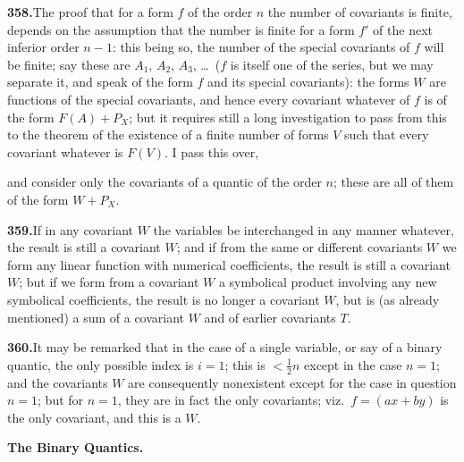 \documentclass[11pt,a4paper]{article}
\theoremstyle{definition}
\begin{document}
\smallskip
\noindent\textbf{358.}\quad The proof that for a form $f$ of the order $n$ the number of covariants is finite, depends on the assumption that the number is finite for a form $f'$ of the next inferior order $n-1$: this being so, the number of the special covariants of $f$ will be finite; say these are $A_1$, $A_2$, $A_3$, \ldots\ ($f$ is itself one of the series, but we may separate it, and speak of the form $f$ and its special covariants): the forms $W$ are functions of the special covariants, and hence every covariant whatever of $f$ is of the form $F(A) + P_X$; but it requires still a long investigation to pass from this to the theorem of the existence of a finite number of forms $V$ such that every covariant whatever is $F(V)$. I pass this over,

\newpage
\noindent and consider only the covariants of a quantic of the order $n$; these are all of them of the form $W + P_X$.

\smallskip
\noindent\textbf{359.}\quad If in any covariant $W$ the variables be interchanged in any manner whatever, the result is still a covariant $W$; and if from the same or different covariants $W$ we form any linear function with numerical coefficients, the result is still a covariant $W$; but if we form from a covariant $W$ a symbolical product involving any new symbolical coefficients, the result is no longer a covariant $W$, but is (as already mentioned) a sum of a covariant $W$ and of earlier covariants $T$.

\smallskip
\noindent\textbf{360.}\quad It may be remarked that in the case of a single variable, or say of a binary quantic, the only possible index is $i=1$; this is $< \frac{1}{2}n$ except in the case $n=1$; and the covariants $W$ are consequently nonexistent except for the case in question $n=1$; but for $n=1$, they are in fact the only covariants; viz.\ $f=(ax+by)$ is the only covariant, and this is a $W$.

\medskip
\noindent\textbf{The Binary Quantics.}
\end{document}

